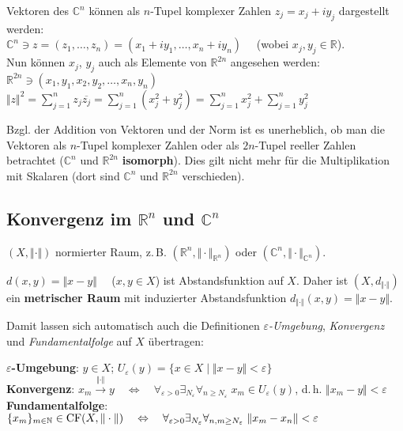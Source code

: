Vektoren des $\mathbb{C}^n$ können als $n$-Tupel komplexer Zahlen
$z_j = x_j + iy_j$ dargestellt werden: \\
$\mathbb{C}^n \ni z = (z_1, \ldots, z_n) =
(x_1 + iy_1, \ldots, x_n + iy_n) \quad$
(wobei $x_j, y_j \in \mathbb{R}$). \\
Nun können $x_j$, $y_j$ auch als Elemente von $\mathbb{R}^{2n}$ angesehen
werden:
$\mathbb{R}^{2n} \ni (x_1, y_1, x_2, y_2, \ldots, x_n, y_n)$ \\
$\Vert z \Vert^2 = \sum_{j=1}^n z_j \overline{z_j} =
\sum_{j=1}^n (x_j^2 + y_j^2) = \sum_{j=1}^n x_j^2 + \sum_{j=1}^n y_j^2$

Bzgl. der Addition von Vektoren und der Norm ist es unerheblich, ob man die
Vektoren als $n$-Tupel komplexer Zahlen oder als $2n$-Tupel reeller Zahlen
betrachtet ($\mathbb{C}^n$ und $\mathbb{R}^{2n}$ \textbf{isomorph}).
Dies gilt nicht mehr für die Multiplikation mit Skalaren
(dort sind $\mathbb{C}^n$ und $\mathbb{R}^{2n}$ verschieden).

\subsection{%
    \texorpdfstring{Konvergenz im $\mathbb{R}^n$ und $\mathbb{C}^n$}%
    {Konvergenz im ℝⁿ und ℂⁿ}%
}

$(X, \Vert \cdot \Vert)$ normierter Raum, z.\,B.
$(\mathbb{R}^n, \Vert \cdot \Vert_{\mathbb{R}^n})$ oder
$(\mathbb{C}^n, \Vert \cdot \Vert_{\mathbb{C}^n})$.

$d(x,y) = \Vert x - y \Vert \quad$ ($x, y \in X$) ist Abstandsfunktion auf $X$.
Daher ist $(X, d_{\Vert \cdot \Vert})$ ein \textbf{metrischer Raum} mit
induzierter Abstandsfunktion
$d_{\Vert \cdot \Vert}(x, y) = \Vert x - y \Vert$.

Damit lassen sich automatisch auch die Definitionen
\emph{$\varepsilon$-Umgebung}, \emph{Konvergenz} und \emph{Fundamentalfolge}
auf $X$ übertragen:

\textbf{$\varepsilon$-Umgebung}: $y \in X$;\; $U_\varepsilon(y) =
\{x \in X \;|\; \Vert x - y \Vert < \varepsilon\}$ \\
\textbf{Konvergenz}:
$x_m \xrightarrow{\Vert \cdot \Vert} y \quad\Leftrightarrow\quad
\forall_{\varepsilon > 0} \exists_{N_\varepsilon}
\forall_{n \ge N_\varepsilon}\;
x_m \in U_\varepsilon(y)$, \;d.\,h. $\Vert x_m - y \Vert < \varepsilon$ \\
\textbf{Fundamentalfolge}:
$\{x_m\}_{m \in \mathbb{N}} \in \operatorname{CF}(X, \Vert \cdot \Vert)
\quad\Leftrightarrow\quad \forall_{\varepsilon > 0} \exists_{N_\varepsilon}
\forall_{n, m \ge N_\varepsilon}\; \Vert x_m - x_n \Vert < \varepsilon$

